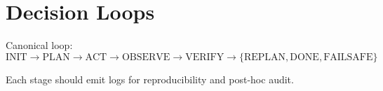 \section*{Decision Loops}

Canonical loop:
\[
\text{INIT}\rightarrow\text{PLAN}\rightarrow\text{ACT}\rightarrow\text{OBSERVE}\rightarrow\text{VERIFY}\rightarrow\{\text{REPLAN},\text{DONE},\text{FAILSAFE}\}
\]

Each stage should emit logs for reproducibility and post-hoc audit.
